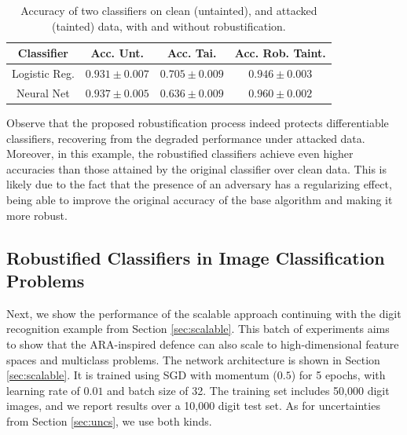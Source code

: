 
\begin{table}[H]
\caption{Accuracy 
	of two classifiers on clean
	(untainted), and attacked (tainted) data, with and without robustification.}
	\centering
	\begin{tabular}{cccc}
		\toprule
		\textbf{Classifier }& \textbf{Acc. Unt.} & \textbf{Acc. Tai.}  & \textbf{Acc. Rob. Taint.} \\
		\midrule
		Logistic Reg.  & $0.931 \pm 0.007$    & $0.705 \pm 0.009$ &    $0.946 \pm 0.003$  \\  
		Neural Net  &      $0.937 \pm 0.005$     &     $0.636 \pm 0.009$    &     $0.960 \pm 0.002$  \\

		\bottomrule
	\end{tabular}%
	\label{tab:rob_exps}%
\end{table}%

Observe that the proposed robustification process
 indeed protects differentiable classifiers, 
 recovering from the degraded performance under attacked
 data. Moreover, in this example, the robustified classifiers
  achieve even higher accuracies than those attained by the original classifier over clean data. This is likely due to the fact that the presence of an adversary has a regularizing effect, being able to improve the original accuracy of the base algorithm and making it more robust. %


\subsection{Robustified Classifiers in Image Classification Problems}\label{sec:exp_scalabl}


Next, we show the performance of the scalable approach continuing with the digit recognition example from Section \ref{sec:scalable}. This batch of experiments aims to show that the ARA-inspired defence  can also scale to high-dimensional feature spaces and multiclass problems. The 
network architecture is shown in Section \ref{sec:scalable}. It is trained using SGD with momentum ($0.5$) for 5 epochs, with learning rate of $0.01$ and batch size of 32. The training set includes 50,000 digit images, and we report results over a 10,000 digit test set. As for uncertainties from Section \ref{sec:uncs}, we use both kinds. 


